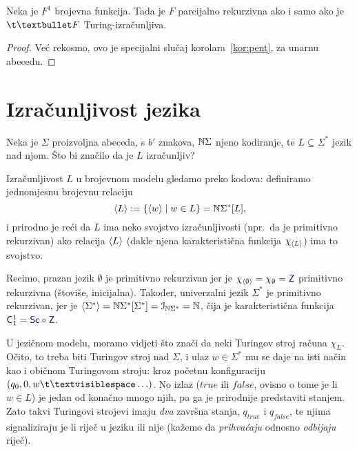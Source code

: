 \begin{korolar}
Neka je $F^1$\! brojevna funkcija. Tada je $F$ parcijalno rekurzivna ako i samo ako je $\t\textbullet F$ Turing-izračunljiva.
\end{korolar}
\begin{proof}
Već rekosmo, ovo je specijalni slučaj korolara~\ref{kor:pent}, za unarnu abecedu.
\end{proof}

\section{Izračunljivost jezika}\label{sec:Todl}

Neka je $\Sigma$ proizvoljna abeceda, s $b'$ znakova, ${\mathbb N}\Sigma$ njeno kodiranje, te $L\subseteq\Sigma^*$ jezik nad njom. Što bi značilo da je $L$ izračunljiv?

Izračunljivost $L$ u brojevnom modelu gledamo preko kodova: definiramo jednomjesnu brojevnu relaciju
\begin{equation}\label{eq:kodLdef}
    \langle L\rangle:=\{\langle w\rangle\mid w\in L\}={\mathbb N}\Sigma^*[L]\text,
\end{equation}
i prirodno je reći da $L$ ima neko svojstvo izračunljivosti (npr.\ da je primitivno rekurzivan) ako relacija $\langle L\rangle$ (dakle njena karakteristična funkcija $\chi_{\langle L\rangle}$) ima to svojstvo.

Recimo, prazan jezik $\emptyset$ je primitivno rekurzivan jer je $\chi_{\kr\emptyset}=\chi_\emptyset=\f Z$ primitivno rekurzivna (štoviše, inicijalna). Također, univerzalni jezik $\Sigma^*$ je primitivno rekurzivan, jer je $\langle\Sigma^*\rangle={\mathbb N}\Sigma^*[\Sigma^*]=\mathcal I_{{\mathbb N}\Sigma^*}={\mathbb N}$, čija je karakteristična funkcija $\f C_1^1=\f{Sc}\circ\f Z$.

U jezičnom modelu, moramo vidjeti što znači da neki Turingov stroj računa $\chi_L$. Očito, to treba biti Turingov stroj nad $\Sigma$, i ulaz $w\in\Sigma^*$ mu se daje na isti način kao i običnom Turingovom stroju: kroz početnu konfiguraciju $(q_0,0,w\bl\ldots)$. No izlaz ($\mathit{true}$ ili $\mathit{false}$, ovisno o tome je li $w\in L$) je jedan od konačno mnogo njih, pa ga je prirodnije predstaviti stanjem. Zato takvi Turingovi strojevi imaju \emph{dva} završna stanja, $q_{\mathit{true}}$ i $q_{\mathit{false}}$, te njima signaliziraju je li riječ u jeziku ili nije (kažemo da \emph{prihvaćaju} odnosno \emph{odbijaju} riječ).

